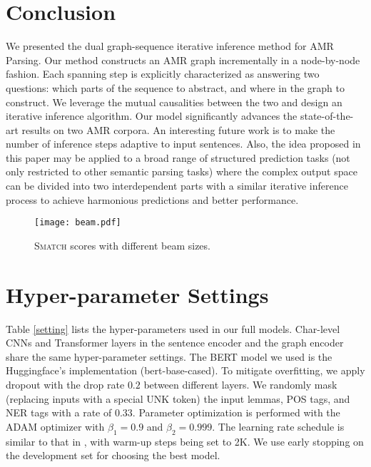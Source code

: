 \documentclass[11pt,a4paper]{article}
\begin{document}
	\section{Conclusion}
	We presented the dual graph-sequence iterative inference method for AMR Parsing. Our method constructs an AMR graph incrementally in a node-by-node fashion. Each spanning step is explicitly characterized as answering two questions: which parts of the sequence to abstract, and where in the graph to construct. We leverage the mutual causalities between the two and design an iterative inference algorithm. Our model significantly advances the state-of-the-art results on two AMR corpora. An interesting future work is to make the number of inference steps adaptive to input sentences. Also, the idea proposed in this paper may be applied to a broad range of structured prediction tasks (not only restricted to other semantic parsing tasks) where the complex output space can be divided into two interdependent parts with a similar iterative inference process to achieve harmonious predictions and better performance.
	\begin{figure}[t]
		\centering
		\texttt{[image: beam.pdf]}
		\caption{\textsc{Smatch} scores with different beam sizes.}
		\label{beam}
	\end{figure}
	
	

\appendix
\newpage
\section{Hyper-parameter Settings}
Table \ref{setting} lists the hyper-parameters used in our full models. Char-level CNNs and Transformer layers in the sentence encoder and the graph encoder share the same hyper-parameter settings. The BERT model \cite{devlin-etal-2019-bert} we used is the Huggingface’s implementation \cite{Wolf2019HuggingFacesTS} (bert-base-cased). To mitigate overfitting, we apply dropout \cite{srivastava2014dropout} with the drop rate $0.2$ between different layers. We randomly mask (replacing inputs with a special UNK token) the input lemmas, POS tags, and NER tags with a rate of $0.33$. Parameter optimization is performed with the ADAM optimizer \cite{kingma2014adam} with $\beta_1=0.9$ and $\beta_2=0.999$. The learning rate schedule is similar to that in , with warm-up steps being set to 2K. We use early stopping on the development set for choosing the best model.
\end{document}
